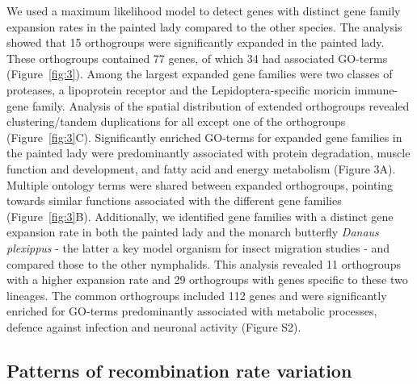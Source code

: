 \documentclass[twocolumn]{bmcart}%
\begin{document}
We used a maximum likelihood model to detect genes with distinct gene family expansion rates in the painted lady compared to the other species. The analysis showed that 15 orthogroups were significantly expanded in the painted lady. These orthogroups contained 77 genes, of which 34 had associated GO-terms (Figure~\ref{fig:3}). Among the largest expanded gene families were two classes of proteases, a lipoprotein receptor and the Lepidoptera-specific moricin immune-gene family. Analysis of the spatial distribution of extended orthogroups revealed clustering/tandem duplications for all except one of the orthogroups (Figure~\ref{fig:3}C). Significantly enriched GO-terms for expanded gene families in the painted lady were predominantly associated with protein degradation, muscle function and development, and fatty acid and energy metabolism (Figure 3A). Multiple ontology terms were shared between expanded orthogroups, pointing towards similar functions associated with the different gene families (Figure~\ref{fig:3}B). Additionally, we identified gene families with a distinct gene expansion rate in both the painted lady and the monarch butterfly \textit{Danaus plexippus} - the latter a key model organism for insect migration studies - and compared those to the other nymphalids. This analysis revealed 11 orthogroups with a higher expansion rate and 29 orthogroups with genes specific to these two lineages. The common orthogroups included 112 genes and were significantly enriched for GO-terms predominantly associated with metabolic processes, defence against infection and neuronal activity (Figure S2).

\subsection*{Patterns of recombination rate variation}
\end{document}
